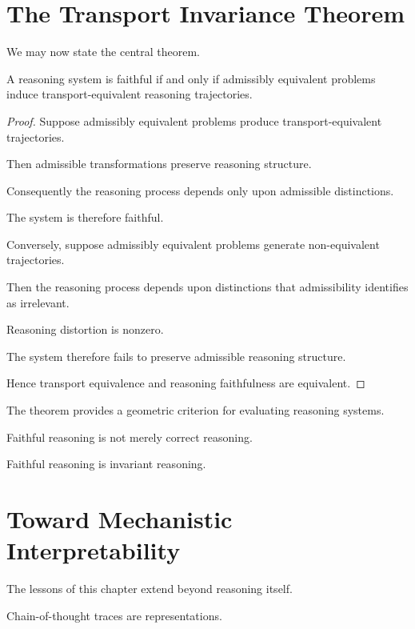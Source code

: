 \documentclass[11pt,oneside,openany]{book}
\begin{document}
\section{The Transport Invariance Theorem}

We may now state the central theorem.

\begin{theorem}

A reasoning system is faithful if and only if admissibly equivalent problems induce transport-equivalent reasoning trajectories.

\end{theorem}

\begin{proof}

Suppose admissibly equivalent problems produce transport-equivalent trajectories.

Then admissible transformations preserve reasoning structure.

Consequently the reasoning process depends only upon admissible distinctions.

The system is therefore faithful.

Conversely, suppose admissibly equivalent problems generate non-equivalent trajectories.

Then the reasoning process depends upon distinctions that admissibility identifies as irrelevant.

Reasoning distortion is nonzero.

The system therefore fails to preserve admissible reasoning structure.

Hence transport equivalence and reasoning faithfulness are equivalent.

\end{proof}

The theorem provides a geometric criterion for evaluating reasoning systems.

Faithful reasoning is not merely correct reasoning.

Faithful reasoning is invariant reasoning.

\section{Toward Mechanistic Interpretability}

The lessons of this chapter extend beyond reasoning itself.

Chain-of-thought traces are representations.
\end{document}
